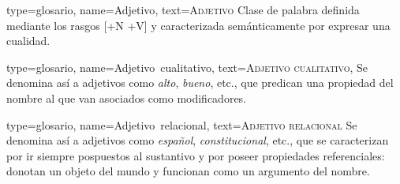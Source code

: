 


{
type={glosario},
name={Adjetivo},
text={\textsc{Adjetivo}}
}
{Clase de palabra definida mediante los rasgos [+N +V] y caracterizada semánticamente por expresar una cualidad.
}

{
type={glosario},
name={Adjetivo~cualitativo},
text={\textsc{Adjetivo cualitativo}},
}
{Se denomina así a adjetivos como \textit{alto}, \textit{bueno}, etc., que predican una propiedad del nombre al que van asociados como modificadores.
}

{
type={glosario},
name={Adjetivo~relacional},
text={\textsc{Adjetivo relacional}}
}
{Se denomina así a adjetivos como \textit{español}, \textit{constitucional}, etc., que se caracterizan por ir siempre pospuestos al sustantivo y por poseer propiedades referenciales: donotan un objeto del mundo y funcionan como un argumento del nombre.
}




